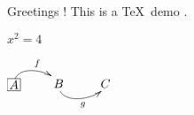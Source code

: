 \documentclass[10pt,a4paper]{article}
\begin{document}
Greetings ! This is a \TeX\ demo .

$x^2=4$

$\xymatrix{
*+<3px>[F-:3px]{A} \ar@`{[]+/u+2em/,[r]+/u+1em/}[r]^{f} & 
B \ar@`{[]+/d+2em/,[r]+/d+1em/}[r]_{g} & 
C
}$
    
\end{document}
